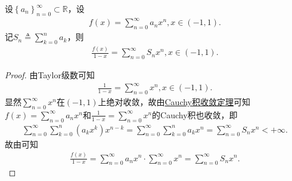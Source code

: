 \documentclass[../../main.tex]{subfiles}%
\begin{document}
\begin{proposition}\label{proposition:幂级数Cauchy积常用技巧}
设$\left\{ a_n \right\} _{n=0}^{\infty}\subset \mathbb{R}$，设
\begin{align*}
f\left( x \right) =\sum_{n=0}^{\infty}{a_nx^n},x\in \left( -1,1 \right) .
\end{align*}
记$S_n\triangleq \sum_{k=0}^n{a_k}$，则
\begin{align*}
\frac{f\left( x \right)}{1-x}=\sum_{n=0}^{\infty}{S_nx^n},x\in \left( -1,1 \right) .
\end{align*}
\end{proposition}
\begin{proof}
由Taylor级数可知
\begin{align*}
\frac{1}{1-x}=\sum_{n=0}^{\infty}{x^n},x\in \left( -1,1 \right) .
\end{align*}
显然$\sum_{n=0}^{\infty}{x^n}$在$\left( -1,1 \right)$上绝对收敛，故由\hyperref[theorem:Cauchy积收敛定理]{Cauchy积收敛定理}可知$f\left( x \right) =\sum_{n=0}^{\infty}{a_nx^n}$和$\frac{1}{1-x}=\sum_{n=0}^{\infty}{x^n}$的Cauchy积也收敛，即
\begin{align*}
\sum_{n=0}^{\infty}{\sum_{k=0}^n{\left( a_kx^k \right) x^{n-k}}}=\sum_{n=0}^{\infty}{\sum_{k=0}^n{a_kx^n}}=\sum_{n=0}^{\infty}{S_nx^n}<+\infty .
\end{align*}
故由可知
\begin{align*}
\frac{f\left( x \right)}{1-x}=\sum_{n=0}^{\infty}{a_nx^n}\cdot \sum_{n=0}^{\infty}{x^n}=\sum_{n=0}^{\infty}{S_nx^n}.
\end{align*}
\end{proof}
\end{document}
